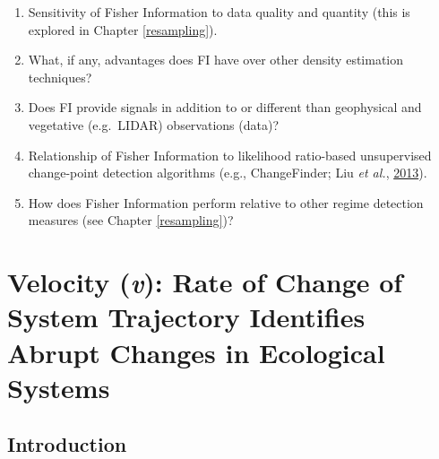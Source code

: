 \documentclass[12pt,twoside,openany]{reedthesis}
\providecommand{\tightlist}{%
  \setlength{\itemsep}{0pt}\setlength{\parskip}{0pt}}
\begin{document}
\begin{enumerate}
\def\labelenumi{\arabic{enumi}.}
\tightlist
\item
  Sensitivity of Fisher Information to data quality and quantity (this is explored in Chapter \ref{resampling}).
\item
  What, if any, advantages does FI have over other density estimation techniques?
\item
  Does FI provide signals in addition to or different than geophysical and vegetative (e.g.~LIDAR) observations (data)?
\item
  Relationship of Fisher Information to likelihood ratio-based unsupervised change-point detection algorithms (e.g., ChangeFinder; Liu \emph{et al.}, \protect\hyperlink{ref-liu2013change}{2013}).
\item
  How does Fisher Information perform relative to other regime detection measures (see Chapter \ref{resampling})?
\end{enumerate}
\hypertarget{velocity}{%
\chapter{\texorpdfstring{Velocity (\emph{v}): Rate of Change of System Trajectory Identifies Abrupt Changes in Ecological Systems}{Velocity (v): Rate of Change of System Trajectory Identifies Abrupt Changes in Ecological Systems}}\label{velocity}}

\hypertarget{introduction-3}{%
\section{Introduction}\label{introduction-3}}
\end{document}
